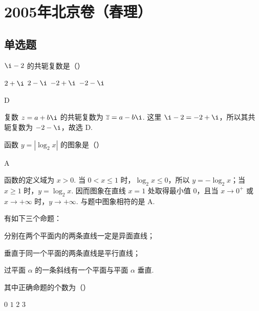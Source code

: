 \chapter{2005年北京卷（春理）}

\section{单选题}

\begin{problem}
\(\i-2\) 的共轭复数是（\quad）

\choices
    {\(2+\i\)}
    {\(2-\i\)}
    {\(-2+\i\)}
    {\(-2-\i\)}
\end{problem}

\begin{answer}
D
\end{answer}

\begin{solution}
复数 \(z=a+b\i\) 的共轭复数为 \(\overline{z}=a-b\i\). 这里 \(\i-2=-2+\i\)，所以其共轭复数为 \(-2-\i\)，故选 D.
\end{solution}

\begin{problem}
函数 \(y=|\log_2 x|\) 的图象是（\quad）

\choices
    {}
    {}
    {}
    {}
\end{problem}

\begin{answer}
A
\end{answer}

\begin{solution}
函数的定义域为 \(x>0\). 当 \(0<x\leqslant1\) 时，\(\log_2x\leqslant0\)，所以 \(y=-\log_2x\)；当 \(x\geqslant1\) 时，\(y=\log_2x\). 因而图象在直线 \(x=1\) 处取得最小值 \(0\)，且当 \(x\to0^+\) 或 \(x\to+\infty\) 时，\(y\to+\infty\). 与题中图象相符的是 A.
\end{solution}

\begin{problem}
有如下三个命题：

\begin{circlelist}
\item 分别在两个平面内的两条直线一定是异面直线；
\item 垂直于同一个平面的两条直线是平行直线；
\item 过平面 \(\alpha\) 的一条斜线有一个平面与平面 \(\alpha\) 垂直.
\end{circlelist}

其中正确命题的个数为（\quad）

\choices
    {\(0\)}
    {\(1\)}
    {\(2\)}
    {\(3\)}
\end{problem}

